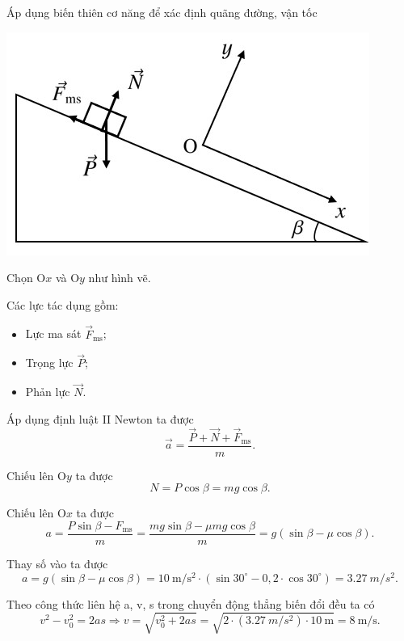 \begin{dang}{Áp dụng biến thiên cơ năng để xác định quãng đường, vận tốc}
{		\begin{center}
			\includegraphics[scale=0.5]{../figs/VN10-PH-33-L-025-3-H2.jpg}
		\end{center}
		
		Chọn O$x$ và O$y$ như hình vẽ.
		
		Các lực tác dụng gồm:
		\begin{itemize}
			\item Lực ma sát $\vec{F}_\text{ms}$;
			\item Trọng lực $\vec{P}$;
			\item Phản lực $\vec{N}$.
		\end{itemize}
		
		Áp dụng định luật II Newton ta được
		\begin{equation*}
			\vec{a}=\dfrac{\vec{P}+\vec{N}+\vec{F}_\text{ms}}{m}.
		\end{equation*}
		
		Chiếu lên O$y$ ta được
		\begin{equation*}
			N = P\cos\beta = mg\cos\beta.
		\end{equation*}
		
		Chiếu lên O$x$ ta được
		\begin{equation*}
			a=\dfrac{P\sin\beta-F_\text{ms}}{m}=\dfrac{mg\sin\beta-\mu mg\cos\beta}{m}=g(\sin\beta-\mu\cos\beta).
		\end{equation*}
		
		Thay số vào ta được
		\begin{equation*}
			a=g(\sin\beta-\mu\cos\beta)=\SI{10}{\meter/\second^2}\cdot (\sin30^\circ-0,2\cdot\cos30^\circ)=\SI{3,27}{m/s^2}.
		\end{equation*}
		
		Theo công thức liên hệ a, v, s trong chuyển động thẳng biến đổi đều ta có
		\begin{equation*}
			v^2-v_0^2=2as\Rightarrow v=\sqrt{v_0^2+2as}=\sqrt{2\cdot \left(\SI{3,27}{m/s^2}\right)\cdot \SI{10}{\meter}}= \SI{8}{\meter/\second}.
		\end{equation*}
		
}
\end{dang}
